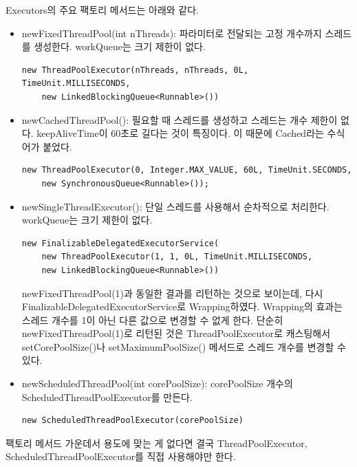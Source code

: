 Executors의 주요 팩토리 메서드는 아래와 같다.
\begin{itemize}

\item newFixedThreadPool(int nThreads): 파라미터로 전달되는 고정 개수까지 스레드를 생성한다. workQueue는 크기 제한이 없다.
\begin{lstlisting}[frame=single] 
new ThreadPoolExecutor(nThreads, nThreads, 0L, TimeUnit.MILLISECONDS, 
    new LinkedBlockingQueue<Runnable>())
\end{lstlisting}

\item newCachedThreadPool(): 필요할 때 스레드를 생성하고 스레드는 개수 제한이 없다. keepAliveTime이 60초로 길다는 것이 특징이다. 이 때문에 Cached라는 수식어가 붙었다.
\begin{lstlisting}[frame=single] 
new ThreadPoolExecutor(0, Integer.MAX_VALUE, 60L, TimeUnit.SECONDS, 
    new SynchronousQueue<Runnable>());
\end{lstlisting}

\item newSingleThreadExecutor(): 단일 스레드를 사용해서 순차적으로 처리한다. workQueue는 크기 제한이 없다. 
\begin{lstlisting}[frame=single] 
new FinalizableDelegatedExecutorService(
	new ThreadPoolExecutor(1, 1, 0L, TimeUnit.MILLISECONDS, 
	new LinkedBlockingQueue<Runnable>())
\end{lstlisting}
newFixedThreadPool(1)과 동일한 결과를 리턴하는 것으로 보이는데, 다시 FinalizableDelegatedExecutorService로 Wrapping하였다. Wrapping의 효과는 스레드 개수를 1이 아닌 다른 값으로 변경할 수 없게 한다. 단순히 newFixedThreadPool(1)로 리턴된 것은 ThreadPoolExecutor로 캐스팅해서 setCorePoolSize()나 setMaximumPoolSize() 메서드로 스레드 개수를 변경할 수 있다.

\item newScheduledThreadPool(int corePoolSize): corePoolSize 개수의 ScheduledThreadPoolExecutor를 만든다.
\begin{lstlisting}[frame=single] 
new ScheduledThreadPoolExecutor(corePoolSize)
\end{lstlisting}

\end{itemize}

팩토리 메서드 가운데서 용도에 맞는 게 없다면 결국 ThreadPoolExecutor, ScheduledThreadPoolExecutor를 직접 사용해야만 한다.\\

